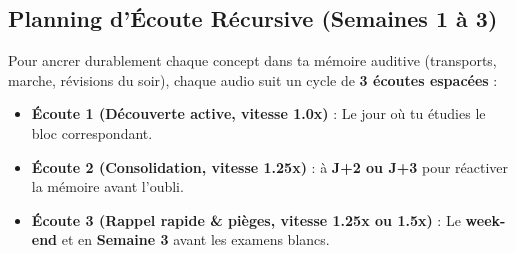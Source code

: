 \documentclass[11pt,a4paper]{article}
\begin{document}
\subsection{Planning d'Écoute Récursive (Semaines 1 à 3)}
Pour ancrer durablement chaque concept dans ta mémoire auditive (transports, marche, révisions du soir), chaque audio suit un cycle de \textbf{3 écoutes espacées} :
\begin{itemize}
    \item \textbf{Écoute 1 (Découverte active, vitesse 1.0x)} : Le jour où tu étudies le bloc correspondant.
    \item \textbf{Écoute 2 (Consolidation, vitesse 1.25x)} : à \textbf{J+2 ou J+3} pour réactiver la mémoire avant l'oubli.
    \item \textbf{Écoute 3 (Rappel rapide \& pièges, vitesse 1.25x ou 1.5x)} : Le \textbf{week-end} et en \textbf{Semaine 3} avant les examens blancs.
\end{itemize}
\end{document}
